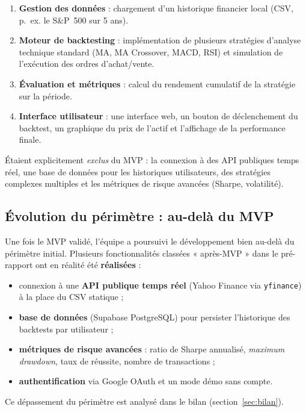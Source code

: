 \documentclass[11pt,a4paper]{article}
\newcommand{\code}[1]{\texttt{#1}}
\begin{document}
\begin{enumerate}[label=\arabic*)]
  \item \textbf{Gestion des données} : chargement d'un historique financier local
        (CSV, p.~ex. le S\&P~500 sur 5 ans).
  \item \textbf{Moteur de backtesting} : implémentation de plusieurs stratégies
        d'analyse technique standard (MA, MA Crossover, MACD, RSI) et simulation
        de l'exécution des ordres d'achat/vente.
  \item \textbf{Évaluation et métriques} : calcul du rendement cumulatif de la
        stratégie sur la période.
  \item \textbf{Interface utilisateur} : une interface web, un bouton de
        déclenchement du backtest, un graphique du prix de l'actif et l'affichage
        de la performance finale.
\end{enumerate}

Étaient explicitement \emph{exclus} du MVP : la connexion à des API publiques
temps réel, une base de données pour les historiques utilisateurs, des stratégies
complexes multiples et les métriques de risque avancées (Sharpe, volatilité).

\subsection{Évolution du périmètre : au-delà du MVP}
\label{sec:evolution}
Une fois le MVP validé, l'équipe a poursuivi le développement bien au-delà du
périmètre initial. Plusieurs fonctionnalités classées « après-MVP » dans le
pré-rapport ont en réalité été \textbf{réalisées} :
\begin{itemize}[leftmargin=1.4em]
  \item connexion à une \textbf{API publique temps réel} (Yahoo Finance via
        \code{yfinance}) à la place du CSV statique ;
  \item \textbf{base de données} (Supabase PostgreSQL) pour persister l'historique
        des backtests par utilisateur ;
  \item \textbf{métriques de risque avancées} : ratio de Sharpe annualisé,
        \emph{maximum drawdown}, taux de réussite, nombre de transactions ;
  \item \textbf{authentification} via Google OAuth et un mode démo sans compte.
\end{itemize}
Ce dépassement du périmètre est analysé dans le bilan (section~\ref{sec:bilan}).
\end{document}
